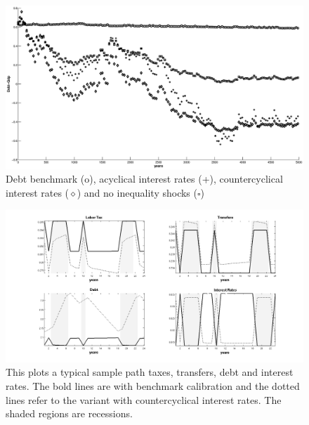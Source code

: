 \documentclass[thmsb,11pt]{article}
\begin{document}
  \begin{figure}[htp]
 \centering
 \includegraphics[width=\textwidth]{Draft25Graphs/LongSimulations.eps}
 \caption{Debt benchmark (o), acyclical interest rates (+), countercyclical interest rates ($\diamond$) and no inequality shocks \scriptsize ($\square$\normalsize) }
 \label{fig:LongSimulations}
 \end{figure}

\newpage

\begin{figure}[htp]
\includegraphics[width=\textwidth]{Draft25Graphs/DiscoutFactorComparison.png}
\caption{This plots a typical sample path taxes, transfers, debt and interest rates. The bold lines are with  benchmark calibration and the dotted lines refer to the variant with countercyclical interest rates. The shaded regions are recessions.}
\label{fig:DiscoutFactorComparison}
\end{figure}

\newpage
\end{document}
